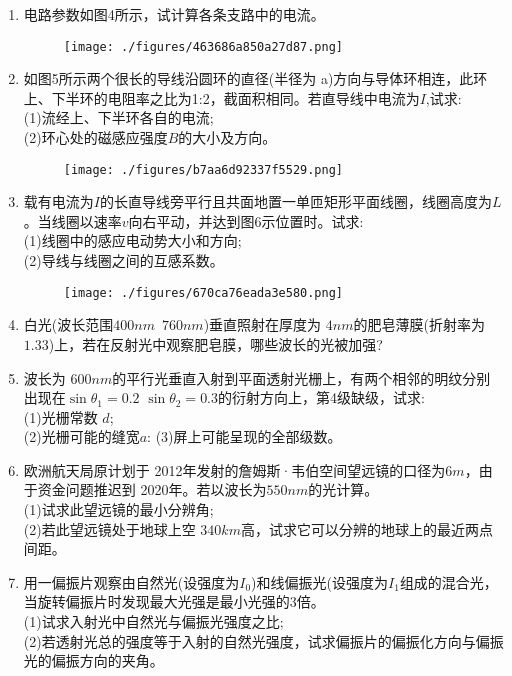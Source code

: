 \begin{enumerate}
\begin{figure}[ht]
\caption{} \label{fig_SD15_1}
\end{figure}
\item 电路参数如图4所示，试计算各条支路中的电流。
\begin{figure}[ht]
\centering
\texttt{[image: ./figures/463686a850a27d87.png]}
\caption{} \label{fig_SD15_4}
\end{figure}
\item 如图5所示两个很长的导线沿圆环的直径(半径为 a)方向与导体环相连，此环上、下半环的电阻率之比为1:2，截面积相同。若直导线中电流为$I$,试求:\\
(1)流经上、下半环各自的电流;\\
(2)环心处的磁感应强度$ B$的大小及方向。
\begin{figure}[ht]
\centering
\texttt{[image: ./figures/b7aa6d92337f5529.png]}
\caption{} \label{fig_SD15_5}
\end{figure}
\item 载有电流为$I$的长直导线旁平行且共面地置一单匝矩形平面线圈，线圈高度为$L$。当线圈以速率$v$向右平动，并达到图6示位置时。试求:\\
(1)线圈中的感应电动势大小和方向;\\
(2)导线与线圈之间的互感系数。
\begin{figure}[ht]
\centering
\texttt{[image: ./figures/670ca76eada3e580.png]}
\caption{} \label{fig_SD15_6}
\end{figure}
\item 白光(波长范围$400nm$~$760nm$)垂直照射在厚度为 $4nm $的肥皂薄膜(折射率为$1.33$)上，若在反射光中观察肥皂膜，哪些波长的光被加强?
\item 波长为 $600nm $的平行光垂直入射到平面透射光栅上，有两个相邻的明纹分别出现在$\sin \theta_1=0.2$ $\sin \theta_2=0.3$的衍射方向上，第4级缺级，试求:\\
(1)光栅常数 $d$;\\
(2)光栅可能的缝宽$a$:
(3)屏上可能呈现的全部级数。
\item 欧洲航天局原计划于 2012年发射的詹姆斯·韦伯空间望远镜的口径为$ 6m$，由于资金问题推迟到 2020年。若以波长为$550nm$的光计算。\\
(1)试求此望远镜的最小分辨角;\\
(2)若此望远镜处于地球上空 $340km $高，试求它可以分辨的地球上的最近两点间距。
\item 用一偏振片观察由自然光(设强度为$I_0$)和线偏振光(设强度为$I_1$组成的混合光，当旋转偏振片时发现最大光强是最小光强的3倍。\\
(1)试求入射光中自然光与偏振光强度之比;\\
(2)若透射光总的强度等于入射的自然光强度，试求偏振片的偏振化方向与偏振光的偏振方向的夹角。
\end{enumerate}